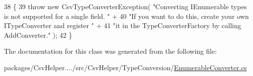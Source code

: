 \begin{DoxyCode}
38         \{
39             \textcolor{keywordflow}{throw} \textcolor{keyword}{new} CsvTypeConverterException( \textcolor{stringliteral}{"Converting IEnumerable types is not supported for a
       single field. "} +
40                                                  \textcolor{stringliteral}{"If you want to do this, create your own ITypeConverter
       and register "} +
41                                                  \textcolor{stringliteral}{"it in the TypeConverterFactory by calling AddConverter."} 
      );
42         \}
\end{DoxyCode}


The documentation for this class was generated from the following file\-:\begin{DoxyCompactItemize}
\item 
packages/\-Csv\-Helper..../src/\-Csv\-Helper/\-Type\-Conversion/\hyperlink{a00234}{Enumerable\-Converter.\-cs}\end{DoxyCompactItemize}
